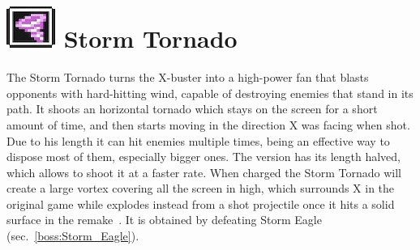 \section{\includegraphics[scale=0.2]{figures/X1/weapons/Storm_T.jpg} Storm Tornado}\label{Storm_tornado}
The Storm Tornado turns the X-buster into a high-power fan that blasts opponents with hard-hitting wind, capable of destroying enemies that stand in its path. It shoots an horizontal tornado which stays on the screen for a short amount of time, and then starts moving in the direction X was facing when shot. Due to his length it can hit enemies multiple times, being an effective way to dispose most of them, especially bigger ones.  The \mhx version has its length halved, which allows to shoot it at a faster rate. When charged the Storm Tornado will create a large vortex covering all the screen in high, which surrounds X in the original game while explodes instead from a shot projectile once it hits a solid surface in the remake~\cite{wiki:Storm_tornado}. It is obtained by defeating Storm Eagle (sec.~\ref{boss:Storm_Eagle}).
